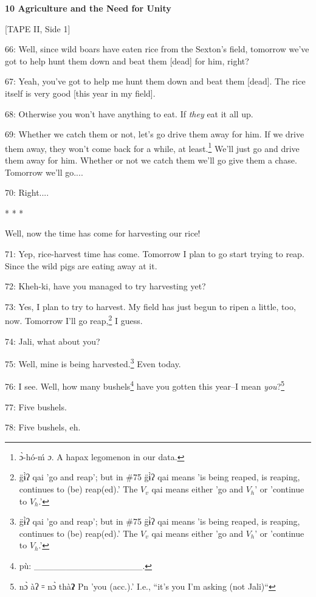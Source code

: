 
\textbf{10 Agriculture and the Need for Unity}

[TAPE II, Side 1]

66: Well, since wild boars have eaten rice from the Sexton's field,  tomorrow we've
got to help hunt them down and beat them [dead] for him, right?

67: Yeah, you've got to help me hunt them down and beat them [dead]. The rice itself
is very good [this year in my field].

68: Otherwise you won't have anything to eat. If \textit{they} eat it all up.

69: Whether we catch them or not, let's go drive them away for him. If we drive
them away, they won't come back for a while, at least.\footnote{ɔ̀-hó-ḿ \emph{ɔ}. A hapax legomenon in our data.} We'll just go and drive
them away for him. Whether or not we catch them we'll go give them a chase. Tomorrow
we'll go....

70: Right....

\begin{center}
* * *
\end{center}

\leftskip=0pt
Well, now the time has come for harvesting our rice!

71: Yep, rice-harvest time has come. Tomorrow I plan to go start trying to reap.
Since the wild pigs are eating away at it.

72: Kheh-ki, have you managed to try harvesting yet?

73: Yes, I plan to try to harvest. My field has just begun to ripen a little, too,
now. Tomorrow I'll go reap,\footnote{g̈ɨ̀ʔ qai 'go and reap'; but in \#75 g̈ɨ̀ʔ qai means 'is being reaped, is reaping, continues to (be) reap(ed).' The $V_v$ qai means either 'go and $V_h$' or 'continue to $V_h$.'} I guess.

74: Jali, what about you?

75: Well, mine is being harvested.\footnote{g̈ɨ̀ʔ qai 'go and reap'; but in \#75 g̈ɨ̀ʔ qai means 'is being reaped, is reaping, continues to (be) reap(ed).' The $V_v$ qai means either 'go and $V_h$' or 'continue to $V_h$.'} Even today.

76: I see. Well, how many bushels\footnote{pù: \_\_\_\_\_\_\_\_\_\_\_\_\_\_\_\_\_.} have you gotten this year--I mean \emph{you}?\footnote{nɔ̀ àʔ ꞊ nɔ̀ thà\textbf{ʔ} Pn 'you (acc.).' I.e., ``it's you I'm asking (not Jali)``}

77: Five bushels.

78: Five bushels, eh.

